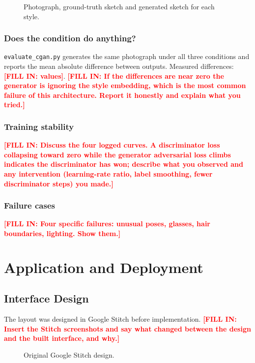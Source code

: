 \documentclass[conference]{IEEEtran}
\newcommand{\PLACEHOLDER}[1]{\textcolor{red}{\textbf{[FILL IN: #1]}}}
\begin{document}
\begin{figure}[t]
\centering
\caption{Photograph, ground-truth sketch and generated sketch for each style.}
\label{fig:task4grid}
\end{figure}

\subsubsection{Does the condition do anything?}
\texttt{evaluate\_cgan.py} generates the same photograph under all three
conditions and reports the mean absolute difference between outputs.
Measured differences: \PLACEHOLDER{values}.
\PLACEHOLDER{If the differences are near zero the generator is ignoring the
style embedding, which is the most common failure of this architecture. Report
it honestly and explain what you tried.}

\subsubsection{Training stability}
\PLACEHOLDER{Discuss the four logged curves. A discriminator loss collapsing
toward zero while the generator adversarial loss climbs indicates the
discriminator has won; describe what you observed and any intervention
(learning-rate ratio, label smoothing, fewer discriminator steps) you made.}

\subsubsection{Failure cases}
\PLACEHOLDER{Four specific failures: unusual poses, glasses, hair boundaries,
lighting. Show them.}

\section{Application and Deployment}
\subsection{Interface Design}
The layout was designed in Google Stitch before implementation.
\PLACEHOLDER{Insert the Stitch screenshots and say what changed between the
design and the built interface, and why.}

\begin{figure}[t]
\centering
\caption{Original Google Stitch design.}
\label{fig:stitch}
\end{figure}
\end{document}
